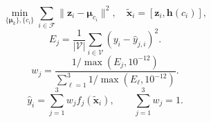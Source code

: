\begin{equation}
\min_{\{\boldsymbol\mu_k\},\{c_i\}}\sum_{i\in\mathcal F}\|\boldsymbol z_i-\boldsymbol\mu_{c_i}\|^2,
\quad \tilde{\boldsymbol x}_i=[\boldsymbol z_i,\boldsymbol h(c_i)],
\label{eq:k}
\end{equation}
\begin{equation}
E_j=\frac{1}{|\mathcal V|}\sum_{i\in\mathcal V}(y_i-\hat y_{j,i})^2.
\end{equation}
\begin{equation}
w_j=\frac{1/\max(E_j,10^{-12})}{\sum_{\ell=1}^{3}1/\max(E_\ell,10^{-12})}.
\label{eq:weights}
\end{equation}
\begin{equation}
\hat y_i=\sum_{j=1}^{3}w_jf_j(\tilde{\boldsymbol x}_i),\qquad \sum_{j=1}^{3}w_j=1.
\label{eq:hybrid}
\end{equation}
